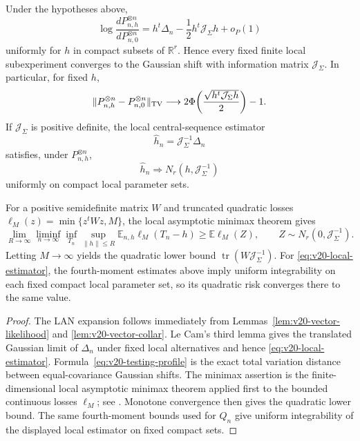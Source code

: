 \begin{theorem}
\label{thm:v20-vector-boundary-lan}
Under the hypotheses above,
\begin{equation}\label{eq:v20-lan}
 \log\frac{dP_{n,h}^{\otimes n}}{dP_{n,0}^{\otimes n}}
 =h^t\Delta_n-\frac12h^t\mathcal J_\Sigma h+o_P(1)
\end{equation}
uniformly for $h$ in compact subsets of $\mathbb R^r$.  Hence every fixed
finite local subexperiment converges to the Gaussian shift with information
matrix $\mathcal J_\Sigma$.  In particular, for fixed $h$,
\begin{equation}\label{eq:v20-testing-profile}
 \|P_{n,h}^{\otimes n}-P_{n,0}^{\otimes n}\|_{\rm TV}
 \longrightarrow
 2\Phi\!\left(\frac{\sqrt{h^t\mathcal J_\Sigma h}}2\right)-1.
\end{equation}
If $\mathcal J_\Sigma$ is positive definite, the local central-sequence
estimator
\begin{equation}\label{eq:v20-local-estimator}
 \widehat h_n=\mathcal J_\Sigma^{-1}\Delta_n
\end{equation}
satisfies, under $P_{n,h}^{\otimes n}$,
\[
 \widehat h_n\Rightarrow N_r(h,\mathcal J_\Sigma^{-1})
\]
uniformly on compact local parameter sets.

For a positive semidefinite matrix $W$ and truncated quadratic losses
$\ell_M(z)=\min\{z^tWz,M\}$, the local asymptotic minimax theorem gives
\begin{equation}\label{eq:v20-minimax-truncated}
 \lim_{R\to\infty}\liminf_{n\to\infty}
 \inf_{T_n}\sup_{\|h\|\le R}
 \mathbb E_{n,h}\ell_M(T_n-h)
 \ge
 \mathbb E\ell_M(Z),
 \qquad Z\sim N_r(0,\mathcal J_\Sigma^{-1}).
\end{equation}
Letting $M\to\infty$ yields the quadratic lower bound
$\operatorname{tr}(W\mathcal J_\Sigma^{-1})$.  For
\eqref{eq:v20-local-estimator}, the fourth-moment estimates above imply
uniform integrability on each fixed compact local parameter set, so its
quadratic risk converges there to the same value.
\end{theorem}

\begin{proof}
The LAN expansion follows immediately from
Lemmas~\ref{lem:v20-vector-likelihood} and
\ref{lem:v20-vector-collar}.  Le Cam's third lemma gives the translated
Gaussian limit of $\Delta_n$ under fixed local alternatives and hence
\eqref{eq:v20-local-estimator}.  Formula~\eqref{eq:v20-testing-profile}
is the exact total variation distance between equal-covariance Gaussian
shifts.  The minimax assertion is the finite-dimensional local asymptotic
minimax theorem applied first to the bounded continuous losses
$\ell_M$; see \cite{IbragimovHasminskii,HiranoPorter}.  Monotone
convergence then gives the quadratic lower bound.  The same fourth-moment
bounds used for $Q_n$ give uniform integrability of the displayed local
estimator on fixed compact sets.
\end{proof}

